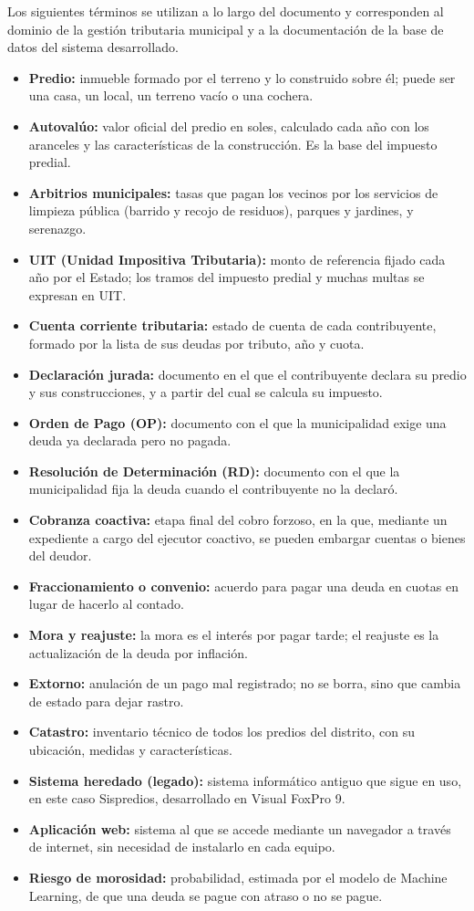 \documentclass[12pt,a4paper]{report}
\begin{document}
Los siguientes términos se utilizan a lo largo del documento y corresponden al dominio de la gestión tributaria municipal y a la documentación de la base de datos del sistema desarrollado.

\begin{itemize}
  \item \textbf{Predio:} inmueble formado por el terreno y lo construido sobre él; puede ser una casa, un local, un terreno vacío o una cochera.
  \item \textbf{Autovalúo:} valor oficial del predio en soles, calculado cada año con los aranceles y las características de la construcción. Es la base del impuesto predial.
  \item \textbf{Arbitrios municipales:} tasas que pagan los vecinos por los servicios de limpieza pública (barrido y recojo de residuos), parques y jardines, y serenazgo.
  \item \textbf{UIT (Unidad Impositiva Tributaria):} monto de referencia fijado cada año por el Estado; los tramos del impuesto predial y muchas multas se expresan en UIT.
  \item \textbf{Cuenta corriente tributaria:} estado de cuenta de cada contribuyente, formado por la lista de sus deudas por tributo, año y cuota.
  \item \textbf{Declaración jurada:} documento en el que el contribuyente declara su predio y sus construcciones, y a partir del cual se calcula su impuesto.
  \item \textbf{Orden de Pago (OP):} documento con el que la municipalidad exige una deuda ya declarada pero no pagada.
  \item \textbf{Resolución de Determinación (RD):} documento con el que la municipalidad fija la deuda cuando el contribuyente no la declaró.
  \item \textbf{Cobranza coactiva:} etapa final del cobro forzoso, en la que, mediante un expediente a cargo del ejecutor coactivo, se pueden embargar cuentas o bienes del deudor.
  \item \textbf{Fraccionamiento o convenio:} acuerdo para pagar una deuda en cuotas en lugar de hacerlo al contado.
  \item \textbf{Mora y reajuste:} la mora es el interés por pagar tarde; el reajuste es la actualización de la deuda por inflación.
  \item \textbf{Extorno:} anulación de un pago mal registrado; no se borra, sino que cambia de estado para dejar rastro.
  \item \textbf{Catastro:} inventario técnico de todos los predios del distrito, con su ubicación, medidas y características.
  \item \textbf{Sistema heredado (legado):} sistema informático antiguo que sigue en uso, en este caso Sispredios, desarrollado en Visual FoxPro 9.
  \item \textbf{Aplicación web:} sistema al que se accede mediante un navegador a través de internet, sin necesidad de instalarlo en cada equipo.
  \item \textbf{Riesgo de morosidad:} probabilidad, estimada por el modelo de Machine Learning, de que una deuda se pague con atraso o no se pague.
\end{itemize}
\end{document}
